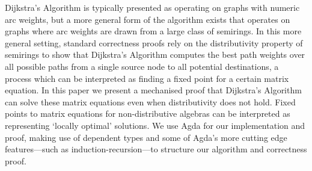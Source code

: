 Dijkstra's Algorithm is typically presented as operating on graphs with numeric arc weights, but a more general form of the algorithm exists that operates on graphs where arc weights are drawn from a large class of semirings.
In this more general setting, standard correctness proofs rely on the distributivity property of semirings to show that Dijkstra's Algorithm computes the best path weights over all possible paths from a single source node to all potential destinations, a process which can be interpreted as finding a fixed point for a certain matrix equation.
In this paper we present a mechanised proof that Dijkstra's Algorithm can solve these matrix equations even when distributivity does not hold.
Fixed points to matrix equations for non-distributive algebras can be interpreted as representing `locally optimal' solutions.
We use Agda for our implementation and proof, making use of dependent types and some of Agda's more cutting edge features---such as induction-recursion---to structure our algorithm and correctness proof.

